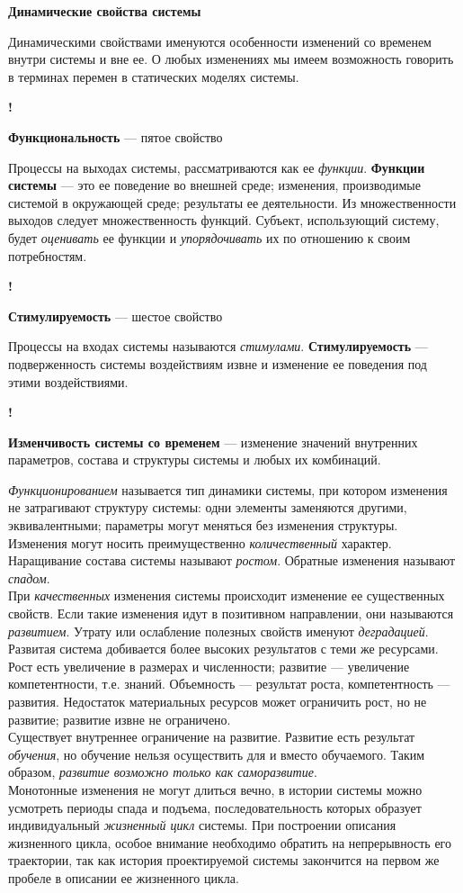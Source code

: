 \documentclass{article}
\newcommand{\note}[1]{\textit{#1}}
\renewcommand{\subsection}[1]{
	\vspace{2em}
	\begin{flushright}
		\large
		\textbf{#1}
	\end{flushright}
	}
\newcommand{\define}[2]{
	\textbf{#1} --- #2
	}
\newcommand{\marked}[2]{
	\begin{flushright}\textbf{!}\hspace{2ex}\vline\hspace{2ex}
		\begin{minipage}{0.9\textwidth}
			\define{#1}{#2}
		\end{minipage}
	\end{flushright}
	}
\begin{document}
\subsection{Динамические свойства системы}
Динамическими свойствами именуются особенности изменений со временем внутри системы и вне ее. О любых изменениях мы имеем возможность говорить в терминах перемен в статических моделях системы.
\marked{Функциональность}{пятое свойство}
Процессы на выходах системы, рассматриваются как ее \note{функции}.\define{Функции системы}{это ее поведение во внешней среде; изменения, производимые системой в окружающей среде; результаты ее деятельности.} Из множественности выходов следует множественность функций. Субъект, использующий систему, будет \note{оценивать} ее функции и \note{упорядочивать} их по отношению к своим потребностям.
\marked{Стимулируемость}{шестое свойство}
Процессы на входах системы называются \note{стимулами}.\define{Стимулируемость}{подверженность системы воздействиям извне и изменение ее поведения под этими воздействиями.}
\marked{Изменчивость системы со временем}{изменение значений внутренних параметров, состава и структуры системы и любых их комбинаций.}
\note{Функционированием} называется тип динамики системы, при котором изменения не затрагивают структуру системы: одни элементы заменяются другими, эквивалентными; параметры могут меняться без изменения структуры.\\
Изменения могут носить преимущественно \note{количественный} характер. Наращивание состава системы называют \note{ростом}. Обратные изменения называют \note{спадом}.\\
При \note{качественных} изменения системы происходит изменение ее существенных свойств. Если такие изменения идут в позитивном направлении, они называются \note{развитием}. Утрату или ослабление полезных свойств именуют \note{деградацией}. Развитая система добивается более высоких результатов с теми же ресурсами.\\
Рост есть увеличение в размерах и численности; развитие --- увеличение компетентности, т.е. знаний. Объемность --- результат роста, компетентность --- развития. Недостаток материальных ресурсов может ограничить рост, но не развитие; развитие извне не ограничено.\\
Существует внутреннее ограничение на развитие. Развитие есть результат \note{обучения}, но обучение нельзя осуществить для и вместо обучаемого. Таким образом, \note{развитие возможно только как саморазвитие}.\\
Монотонные изменения не могут длиться вечно, в истории системы можно усмотреть периоды спада и подъема, последовательность которых образует индивидуальный \note{жизненный цикл} системы. При построении описания жизненного цикла, особое внимание необходимо обратить на непрерывность его траектории, так как история проектируемой системы закончится на первом же пробеле в описании ее жизненного цикла.
\end{document}
